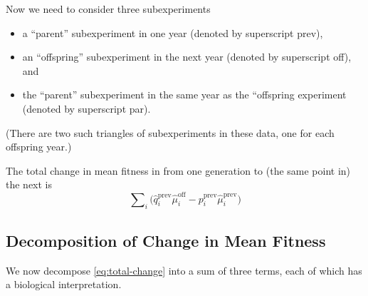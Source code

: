\documentclass[11pt]{article}
\begin{document}
Now we need to consider three subexperiments
\begin{itemize}
\item a ``parent'' subexperiment in one year (denoted by superscript prev),
\item an ``offspring'' subexperiment in the next year (denoted
    by superscript off), and
\item the ``parent'' subexperiment in the same year as the ``offspring
    experiment (denoted by superscript par).
\end{itemize}
(There are two such triangles of subexperiments in these data, one
for each offspring year.)

The total change in mean fitness in from one generation to (the same point in) the next is
\begin{equation} \label{eq:total-change}
   \sum\nolimits_i \bigl(
   \hat{q}_i^\text{prev} \hat{\mu}_i^\text{off}
   -
   p_i^\text{prev} \hat{\mu}_i^\text{prev}
   \bigr)
\end{equation}

\subsection{Decomposition of Change in Mean Fitness} \label{sec:decompose}

We now decompose \eqref{eq:total-change} into a sum of three terms,
each of which has a biological interpretation.
\end{document}
